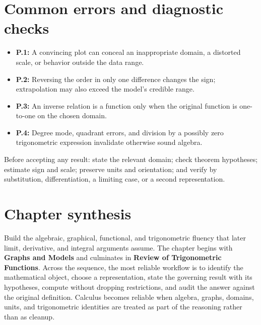 \documentclass[11pt]{article}
\begin{document}
\section{Common errors and diagnostic checks}
\begin{warningbox}
\begin{itemize}
\item \textbf{P.1:} A convincing plot can conceal an inappropriate domain, a distorted scale, or behavior outside the data range.
\item \textbf{P.2:} Reversing the order in only one difference changes the sign; extrapolation may also exceed the model's credible range.
\item \textbf{P.3:} An inverse relation is a function only when the original function is one-to-one on the chosen domain.
\item \textbf{P.4:} Degree mode, quadrant errors, and division by a possibly zero trigonometric expression invalidate otherwise sound algebra.
\end{itemize}
\end{warningbox}
\begin{checkbox}
Before accepting any result: state the relevant domain; check theorem hypotheses; estimate sign and scale; preserve units and orientation; and verify by substitution, differentiation, a limiting case, or a second representation.
\end{checkbox}

\section{Chapter synthesis}
Build the algebraic, graphical, functional, and trigonometric fluency that later limit, derivative, and integral arguments assume. The chapter begins with \textbf{Graphs and Models} and culminates in \textbf{Review of Trigonometric Functions}. Across the sequence, the most reliable workflow is to identify the mathematical object, choose a representation, state the governing result with its hypotheses, compute without dropping restrictions, and audit the answer against the original definition. Calculus becomes reliable when algebra, graphs, domains, units, and trigonometric identities are treated as part of the reasoning rather than as cleanup.
\end{document}
